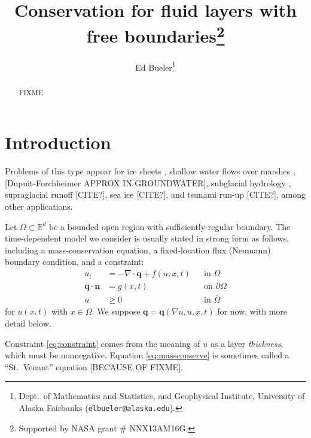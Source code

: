 \documentclass[final,leqno,onefignum,onetabnum]{siamltex1213bueler}
\title{Conservation for fluid layers with free boundaries\thanks{Supported by NASA grant \# NNX13AM16G.}}
\author{Ed Bueler\thanks{Dept.~of Mathematics and Statistics, and Geophysical Institute, University of Alaska Fairbanks (\texttt{elbueler@alaska.edu}).}}
\newcommand\bn{\mathbf{n}}
\newcommand\bq{\mathbf{q}}
\newcommand{\Div}{\nabla\cdot}
\renewcommand{\grad}{\nabla}
\newcommand\RR{\mathbb{R}}
\begin{document}
\maketitle
{}%

\begin{abstract}
FIXME
\end{abstract}




\pagestyle{myheadings}
\thispagestyle{plain}

\section{Introduction}

Problems of this type appear for ice sheets \cite{JouvetBueler2012}, shallow water flows over marshes \cite{AlonsoSantillanaDawson}, [Dupuit-Forchheimer APPROX IN GROUNDWATER], subglacial hydrology \cite{AschwandenBuelerKhroulevBlatter,BuelervanPeltDRAFT,Schoofetal2012}, supraglacial runoff [CITE?], sea ice [CITE?], and tsunami run-up [CITE?], among other applications.

Let $\Omega \subset \RR^d$ be a bounded open region with sufficiently-regular boundary.  The time-dependent model we consider is usually stated in strong form as follows, including a mass-conservation equation, a fixed-location flux (Neumann) boundary condition, and a constraint:
\begin{align}
u_t &= - \Div \bq + f(u,x,t) &&\text{in } \Omega \label{eq:massconserve} \\
\bq \cdot \bn &= g(x,t) &&\text{on } \partial\Omega \label{eq:fixedneumann} \\
u &\ge 0 &&\text{in } \bar\Omega \label{eq:constraint}
\end{align}
for $u(x,t)$ with $x\in \Omega$.  We suppose $\bq = \bq(\grad u, u, x, t)$ for now, with more detail below.  

Constraint \eqref{eq:constraint} comes from the meaning of $u$ as a layer \emph{thickness}, which must be nonnegative.  Equation \eqref{eq:massconserve} is sometimes called a ``St.~Venant'' equation [BECAUSE OF FIXME].
\end{document}

